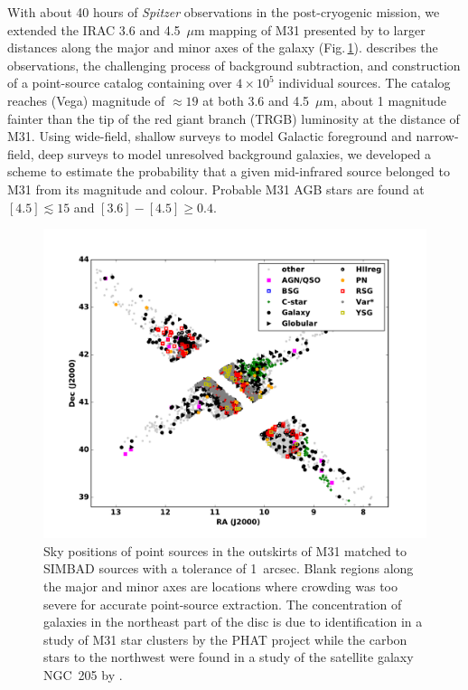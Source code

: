 \documentclass{iau}
\begin{document}
With about 40 hours of {\it Spitzer} observations in the post-cryogenic mission, we extended the IRAC 3.6 and 4.5~$\mu$m
mapping of M31 presented by \cite[Barmby \etal\ (2006)]{barmby06} to larger distances along the major and minor
axes of the galaxy (Fig.\,\ref{fig1}). \cite[Rafiei Ravandi \etal\ (2016)]{rr16} describes the observations, the challenging process of background
subtraction, and construction of a point-source catalog containing over $4\times 10^5$ individual sources. The catalog reaches (Vega)
magnitude of $\approx 19$ at both 3.6 and 4.5~$\mu$m, about 1 magnitude fainter than the tip of the red giant branch (TRGB) luminosity
at the distance of M31. Using wide-field, shallow surveys to model Galactic foreground and narrow-field, deep surveys to model 
unresolved background galaxies, we developed a scheme to estimate the probability that 
a given mid-infrared source belonged to M31 from its magnitude and colour. Probable M31 AGB stars
are found  at $[4.5]\lesssim15$ and $[3.6]-[4.5] \geq 0.4$. 


\begin{figure}[t]
\begin{center}
 \includegraphics[width=5in]{barmby_iaus321_fig1} 
 \caption{Sky positions of point sources in the outskirts of M31 matched to SIMBAD sources with a tolerance of 1~arcsec. 
 Blank regions along the major and minor axes are locations where crowding was too severe for accurate point-source extraction.
The concentration of galaxies in the northeast part of the disc is due to identification in a study of M31 star clusters by the PHAT project 
\cite[(Johnson \etal\ 2012)]{johnson12} 
while the carbon stars to the northwest were found in a study of the satellite galaxy NGC~205 by \cite[Demers, Battinelli \& Letarte (2003)]{dbl03}.}
   \label{fig1}
\end{center}
\end{figure}
\end{document}
